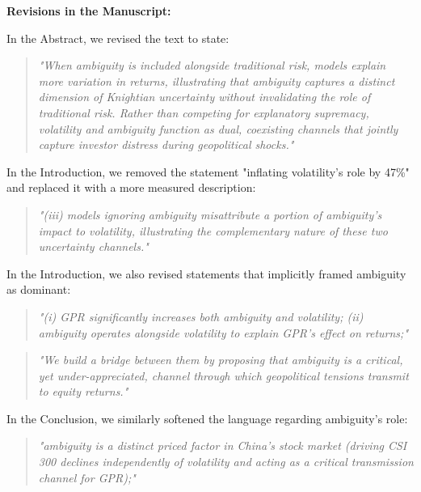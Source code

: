 \documentclass[12pt]{article}
\begin{document}
\begin{highlightbox}
\textbf{Revisions in the Manuscript:}

In the Abstract, we revised the text to state:
\vspace{0.2cm}
\begin{quote}
\color{red}\itshape "When ambiguity is included alongside traditional risk, models explain more variation in returns, illustrating that ambiguity captures a distinct dimension of Knightian uncertainty without invalidating the role of traditional risk. Rather than competing for explanatory supremacy, volatility and ambiguity function as dual, coexisting channels that jointly capture investor distress during geopolitical shocks."
\end{quote}
\vspace{0.2cm}

In the Introduction, we removed the statement "inflating volatility's role by 47\%" and replaced it with a more measured description:
\vspace{0.2cm}
\begin{quote}
\color{red}\itshape "(iii) models ignoring ambiguity misattribute a portion of ambiguity's impact to volatility, illustrating the complementary nature of these two uncertainty channels."
\end{quote}
\vspace{0.2cm}
In the Introduction, we also revised statements that implicitly framed ambiguity as dominant:
\vspace{0.2cm}
\begin{quote}
\color{red}\itshape "(i) GPR significantly increases both ambiguity and volatility; (ii) ambiguity operates alongside volatility to explain GPR's effect on returns;"
\end{quote}
\vspace{0.2cm}
\begin{quote}
\color{red}\itshape "We build a bridge between them by proposing that ambiguity is a critical, yet under-appreciated, channel through which geopolitical tensions transmit to equity returns."
\end{quote}
\vspace{0.2cm}

In the Conclusion, we similarly softened the language regarding ambiguity's role:
\vspace{0.2cm}
\begin{quote}
\color{red}\itshape "ambiguity is a distinct priced factor in China’s stock market (driving CSI 300 declines independently of volatility and acting as a critical transmission channel for GPR);"
\end{quote}
\end{highlightbox}
\end{document}
